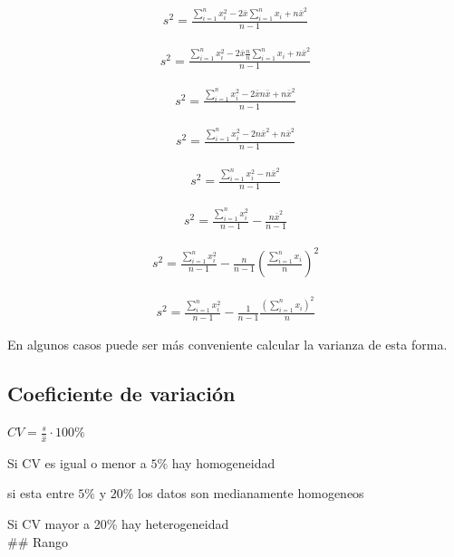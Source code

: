 \documentclass[twocolumn]{article}
\begin{document}
\begin{align}
s^2 =  \frac{\sum_{i=1}^n x_i^2 - 2\bar{x}\sum_{i=1}^n x_i+ n\bar{x}^2}{n-1}
\end{align}

\begin{align}
s^2 =  \frac{\sum_{i=1}^n x_i^2 - 2\bar{x} \frac{n}{n}\sum_{i=1}^n x_i + n\bar{x}^2}{n-1}
\end{align}

\begin{align}
s^2 =  \frac{\sum_{i=1}^n x_i^2 - 2\bar{x} n \bar{x} + n\bar{x}^2}{n-1}
\end{align}

\begin{align}
s^2 =  \frac{\sum_{i=1}^n x_i^2 - 2 n \bar{x}^2 + n\bar{x}^2}{n-1}
\end{align}

\begin{align}
s^2 =  \frac{\sum_{i=1}^n x_i^2 - n \bar{x}^2 }{n-1}
\end{align}

\begin{align}
s^2 =  \frac{\sum_{i=1}^n x_i^2}{n-1} -\frac{ n \bar{x}^2 }{n-1}
\end{align}

\begin{align}
s^2 =  \frac{\sum_{i=1}^n x_i^2}{n-1} -\frac{ n }{n-1}
\left( \frac{\sum_{i=1}^n x_i}{n} \right)^2
\end{align}

\begin{align}
s^2 =  \frac{\sum_{i=1}^n x_i^2}{n-1} -\frac{ 1 }{n-1}
 \frac{\left(\sum_{i=1}^n x_i\right)^2}{n} 
\end{align}

En algunos casos puede ser más conveniente calcular la varianza de esta
forma.

\subsection{Coeficiente de variación}\label{coeficiente-de-variaciuxf3n}

\(CV = \frac{s}{\hat{x}} \cdot 100 \%\)

Si CV es igual o menor a \(5 \%\) hay homogeneidad

si esta entre \(5\%\) y \(20\%\) los datos son medianamente homogeneos

Si CV mayor a 20\% hay heterogeneidad\\
\#\# Rango
\end{document}
